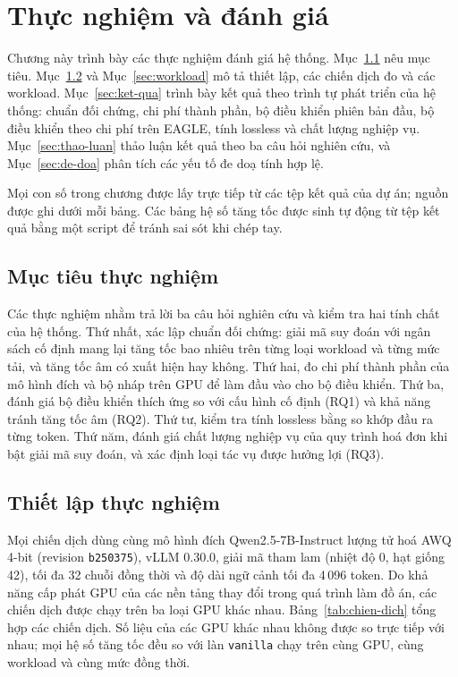\chapter{Thực nghiệm và đánh giá}
\label{chap:thu-nghiem}

Chương này trình bày các thực nghiệm đánh giá hệ thống. Mục~\ref{sec:muc-tieu-tn} nêu mục tiêu. Mục~\ref{sec:thiet-lap} và Mục~\ref{sec:workload} mô tả thiết lập, các chiến dịch đo và các workload. Mục~\ref{sec:ket-qua} trình bày kết quả theo trình tự phát triển của hệ thống: chuẩn đối chứng, chi phí thành phần, bộ điều khiển phiên bản đầu, bộ điều khiển theo chi phí trên EAGLE, tính lossless và chất lượng nghiệp vụ. Mục~\ref{sec:thao-luan} thảo luận kết quả theo ba câu hỏi nghiên cứu, và Mục~\ref{sec:de-doa} phân tích các yếu tố đe doạ tính hợp lệ.

Mọi con số trong chương được lấy trực tiếp từ các tệp kết quả của dự án; nguồn được ghi dưới mỗi bảng. Các bảng hệ số tăng tốc được sinh tự động từ tệp kết quả bằng một script để tránh sai sót khi chép tay.

\section{Mục tiêu thực nghiệm}
\label{sec:muc-tieu-tn}

Các thực nghiệm nhằm trả lời ba câu hỏi nghiên cứu và kiểm tra hai tính chất của hệ thống. Thứ nhất, xác lập chuẩn đối chứng: giải mã suy đoán với ngân sách cố định mang lại tăng tốc bao nhiêu trên từng loại workload và từng mức tải, và tăng tốc âm có xuất hiện hay không. Thứ hai, đo chi phí thành phần của mô hình đích và bộ nháp trên GPU để làm đầu vào cho bộ điều khiển. Thứ ba, đánh giá bộ điều khiển thích ứng so với cấu hình cố định (RQ1) và khả năng tránh tăng tốc âm (RQ2). Thứ tư, kiểm tra tính lossless bằng so khớp đầu ra từng token. Thứ năm, đánh giá chất lượng nghiệp vụ của quy trình hoá đơn khi bật giải mã suy đoán, và xác định loại tác vụ được hưởng lợi (RQ3).

\section{Thiết lập thực nghiệm}
\label{sec:thiet-lap}

Mọi chiến dịch dùng cùng mô hình đích Qwen2.5-7B-Instruct lượng tử hoá AWQ 4-bit (revision \texttt{b250375}), vLLM 0.30.0, giải mã tham lam (nhiệt độ 0, hạt giống 42), tối đa 32 chuỗi đồng thời và độ dài ngữ cảnh tối đa 4\,096 token. Do khả năng cấp phát GPU của các nền tảng thay đổi trong quá trình làm đồ án, các chiến dịch được chạy trên ba loại GPU khác nhau. Bảng~\ref{tab:chien-dich} tổng hợp các chiến dịch. Số liệu của các GPU khác nhau không được so trực tiếp với nhau; mọi hệ số tăng tốc đều so với làn \texttt{vanilla} chạy trên cùng GPU, cùng workload và cùng mức đồng thời.

